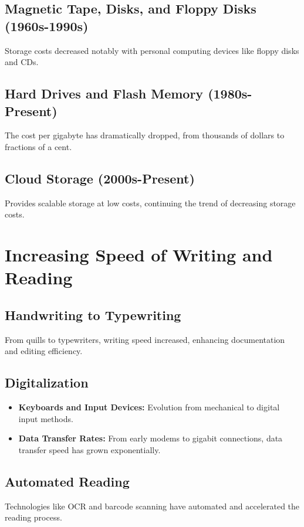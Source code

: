\documentclass[12pt,titlepage]{book}
\begin{document}
\subsection{Magnetic Tape, Disks, and Floppy Disks (1960s-1990s)}
Storage costs decreased notably with personal computing devices like floppy disks and CDs.

\subsection{Hard Drives and Flash Memory (1980s-Present)}
The cost per gigabyte has dramatically dropped, from thousands of dollars to fractions of a cent.

\subsection{Cloud Storage (2000s-Present)}
Provides scalable storage at low costs, continuing the trend of decreasing storage costs.

\section{Increasing Speed of Writing and Reading}

\subsection{Handwriting to Typewriting}
From quills to typewriters, writing speed increased, enhancing documentation and editing efficiency.

\subsection{Digitalization}
\begin{itemize}
    \item \textbf{Keyboards and Input Devices:} Evolution from mechanical to digital input methods.
    \item \textbf{Data Transfer Rates:} From early modems to gigabit connections, data transfer speed has grown exponentially.
\end{itemize}

\subsection{Automated Reading}
Technologies like OCR and barcode scanning have automated and accelerated the reading process.
\end{document}
